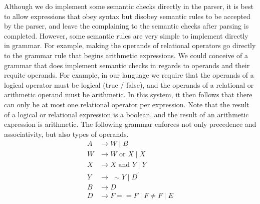 \documentclass{report}
\begin{document}
\begin{itemize}
        \bigbreak \noindent 
        \begin{minipage}[ht]{0.47\textwidth}
        \end{minipage}
        \begin{minipage}[h]{0.47\textwidth}
        \end{minipage}
        \bigbreak \noindent 
         Although we do implement some semantic checks directly in the parser, it is best to allow expressions that obey syntax but disobey semantic rules to be accepted by the parser, and leave the complaining to the semantic checks after parsing is completed. However, some semantic rules are very simple to implement directly in grammar. For example, making the operands of relational operators go directly to the grammar rule that begins arithmetic expressions. 
         \bigbreak \noindent 
         We could conceive of a grammar that does implement semantic checks in regards to operands and their requite operands. For example, in our language we require that the operands of a logical operator must be logical (true / false), and the operands of a relational or arithmetic operand must be arithmetic. In this system, it then follows that there can only be at most one relational operator per expression. 
         \bigbreak \noindent 
         Note that the result of a logical or relational expression is a boolean, and the result of an arithmetic expression is arithmetic.
         \bigbreak \noindent 
         The following grammar enforces not only precedence and associativity, but also types of operands.
        \begin{align*}
            A &\to W \mid B \\
            W &\to W \text{ or } X \mid X \\
            X &\to X \text{ and } Y \mid Y\\
            Y &\to\; \sim Y \mid D^{\prime}\\
            B &\to D \\
            D &\to F == F \mid F \ne F \mid E\\

\end{align*}
\end{itemize}
\end{document}
